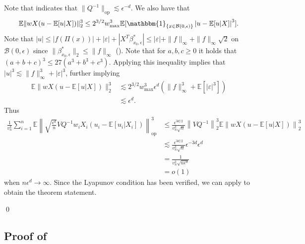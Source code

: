 \documentclass[11pt]{article}
\begin{document}
Note that  indicates that $\|Q^{-1}\|_{\text{op}} \lesssim \epsilon^{-d}$. We also have that 
\[\mathbb{E}\|wX(u - \mathbb{E}[u|X])\|_2^3 \leq 2^{3/2}w^3_{\max}\mathbb{E}[\mathbbm{1}_{\{x \in \mathcal{B}(0, \epsilon)\}}\left|u - \mathbb{E}[u|X]\right|^3].\] 
Note that $|u| \leq |f(\Pi(x))| + |\varepsilon| + |X^T\beta^*_{x_0, \epsilon}| \leq |\varepsilon| + \|f\|_{\infty} + \|f\|_\infty\sqrt{2}$ on $\mathcal{B}(0, \epsilon)$ since $\|\beta^*_{x_0, \epsilon}\|_2 \leq \|f\|_{\infty}$ (). Note that for $a, b, c \geq 0$ it holds that $(a + b + c)^3 \leq 27(a^3 + b^3 + c^3)$. Applying this inequality implies that $|u|^3 \lesssim \|f\|^{3}_{\infty} + |\varepsilon|^3$, further implying
\begin{align*}
    \mathbb{E}\|wX(u - \mathbb{E}[u|X])\|_2^3 &\lesssim  2^{3/2}w^3_{\max}\epsilon^d(\|f\|_{\infty}^3+ \mathbb{E}[|\varepsilon|^3]) \\
    &\lesssim \epsilon^d.
\end{align*}
Thus
\begin{align*}
     \frac{1}{v_n^{3}}\sum_{i = 1}^n\mathbb{E}\left\|\sqrt{\frac{\epsilon^{d}}{n}}VQ^{-1}w_iX_i(u_i - \mathbb{E}[u_i|X_i])\right\|_{\text{op}}^3 
     &\leq  \frac{\epsilon^{3d/2}}{v_n^3\sqrt{n}}\left\|VQ^{-1}\right\|_2^3\mathbb{E}\left\|wX(u - \mathbb{E}[u|X])\right\|_2^3 \\
     &\lesssim \frac{\epsilon^{3d/2}}{v_n^3\sqrt{n}}\epsilon^{-3d}\epsilon^d \\
     &= \frac{1}{v_n^3\sqrt{n\epsilon^d}} \\
     &= o(1)
\end{align*}
when $n\epsilon^d \rightarrow \infty$. Since the Lyapunov condition has been verified, we can apply  to obtain the theorem statement.

\qed{}

\subsection{Proof of } \label{sec: proof of reg decomp}
\end{document}

